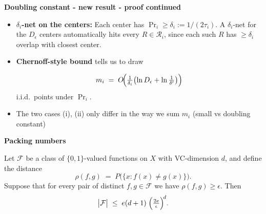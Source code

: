 \documentclass{beamer}
\begin{document}
\begin{frame}{\textbf{Doubling constant - new result - proof continued}}
  \begin{itemize}
    \item \(\delta_i\)\textbf{-net on the centers:}  
     Each center has \(\Pr_i \ge
      \delta_i:=1/(2\tau_i)\).  A \(\delta_i\)-net for the
      \(D_\epsilon\) centers automatically hits every \(R\in\mathcal{R}_i\),
      since each such \(R\) has $\ge \delta_i$ overlap with closest center.

    \item \textbf{Chernoff-style bound} tells us to draw  
      
      \[
        m_i \;=\; O\!\Bigl(\tfrac1{\delta_i}\bigl(\ln D_\epsilon+\ln\tfrac1{\delta'}\bigr)\Bigr)
      \]
      i.i.d.\ points under \(\Pr_i\).
      \item The two cases (i), (ii) only differ in the way we sum $m_i$ (small vs doubling constant) 
      \end{itemize}
      
\end{frame}

\begin{frame}{\textbf{Packing numbers}}
    \begin{theorem}[Haussler]
Let \(\mathcal F\) be a class of \(\{0,1\}\)-valued functions on \(X\) with VC-dimension \(d\), and define the distance
\[
\rho(f,g)\;=\;P\bigl(\{x:f(x)\neq g(x)\}\bigr).
\]
Suppose that for every pair of distinct \(f,g\in\mathcal F\) we have \(\rho(f,g)\ge\epsilon\).  Then
\[
\bigl|\mathcal F\bigr|\;\le\;
e(d+1)
\;\Bigl(\tfrac{2e}{\epsilon}\Bigr)^{\!d}.
\]
\end{theorem}

\end{frame}
\end{document}
